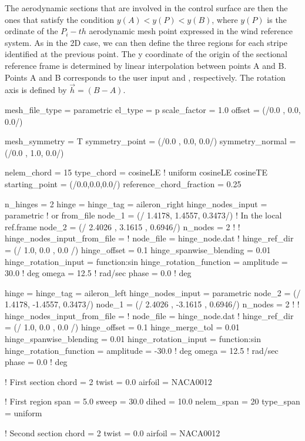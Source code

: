The aerodynamic sections that are involved in the control surface are then the 
ones that satisfy the condition $y(A) < y(P) < y(B)$, where $y(P)$ is the 
ordinate of the $P_i-th$ aerodynamic mesh point expressed in the wind reference system. 
As in the 2D case, we can then define the three regions for each stripe identified 
at the previous point. The y coordinate of the origin of the sectional reference 
frame is determined by linear interpolation between points A and B. 
Points A and B corresponds to the user input  and , respectively. 
The rotation axis is defined by $\Vec{h} = (B - A)$.

\begin{inputfile}[frame=single, caption={Parametric geometry for flapped wing}, 
  label={file:parametric_example_flapped_wing.in}]
mesh_file_type = parametric
el_type = p
scale_factor = 1.0
offset = (/0.0 , 0.0,  0.0/)

mesh_symmetry = T
symmetry_point   = (/0.0 , 0.0,  0.0/)
symmetry_normal = (/0.0 , 1.0,  0.0/)

nelem_chord = 15
type_chord = cosineLE   ! uniform  cosineLE  cosineTE
starting_point = (/0.0,0.0,0.0/)
reference_chord_fraction = 0.25

n_hinges = 2
hinge = {
  hinge_tag = aileron_right
  hinge_nodes_input = parametric      ! or from_file
  node_1 = (/ 1.4178, 1.4557, 0.3473/)  ! In the local ref.frame
  node_2 = (/ 2.4026  , 3.1615  , 0.6946/)
  n_nodes = 2
  ! }
  ! hinge_nodes_input_from_file = {
  !   node_file = hinge_node.dat
  ! }
  hinge_ref_dir = (/ 1.0, 0.0 , 0.0 /)
  hinge_offset  = 0.1
  hinge_spanwise_blending = 0.01
  hinge_rotation_input = function:sin
  hinge_rotation_function = {
    amplitude = 30.0    ! deg
    omega     =  12.5   ! rad/sec
    phase     =  0.0    ! deg
  }

hinge = {
  hinge_tag = aileron_left
  hinge_nodes_input = parametric      
  node_2 = (/ 1.4178, -1.4557, 0.3473/)  
  node_1 = (/ 2.4026  , -3.1615  , 0.6946/)
  n_nodes = 2
  ! }
  ! hinge_nodes_input_from_file = {
  !   node_file = hinge_node.dat
  ! }
  hinge_ref_dir = (/ 1.0, 0.0 , 0.0 /)
  hinge_offset  = 0.1
  hinge_merge_tol = 0.01
  hinge_spanwise_blending = 0.01
  hinge_rotation_input = function:sin
  hinge_rotation_function = {
    amplitude = -30.0    ! deg
    omega     =  12.5    ! rad/sec
    phase     =  0.0     ! deg
  }


! First section
chord = 2
twist = 0.0
airfoil = NACA0012

! First region
span = 5.0
sweep = 30.0
dihed = 10.0
nelem_span = 20
type_span = uniform

! Second section
chord = 2
twist = 0.0
airfoil = NACA0012
\end{inputfile}

